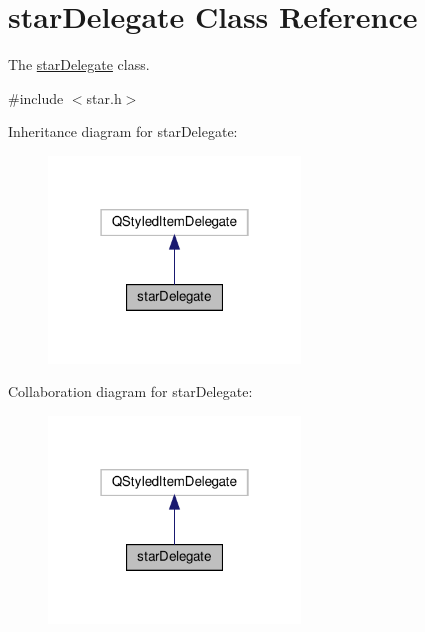 \hypertarget{classstar_delegate}{}\section{star\+Delegate Class Reference}
\label{classstar_delegate}


The \mbox{\hyperlink{classstar_delegate}{star\+Delegate}} class.  




{\ttfamily \#include $<$star.\+h$>$}



Inheritance diagram for star\+Delegate\+:\nopagebreak
\begin{figure}[H]
\begin{center}
\leavevmode
\includegraphics[width=190pt]{classstar_delegate__inherit__graph}
\end{center}
\end{figure}


Collaboration diagram for star\+Delegate\+:\nopagebreak
\begin{figure}[H]
\begin{center}
\leavevmode
\includegraphics[width=190pt]{classstar_delegate__coll__graph}
\end{center}
\end{figure}
